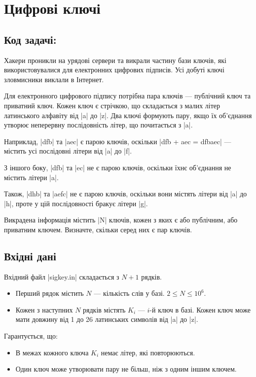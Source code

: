 \documentclass[12pt,a4paper]{article}
\begin{document}
\section*{Цифрові ключі \hfill {}}


\subsection*{Код задачі: }

Хакери проникли на урядові сервери та викрали частину бази ключів, які використовувалися для електронних цифрових підписів.
Усі добуті ключі зловмисники виклали в Інтернет.

Для електронного цифрового підпису потрібна пара ключів --- публічний ключ та приватний ключ. Кожен ключ є стрічкою, що складається з малих літер латинського алфавіту від |a| до |z|. Два ключі формують пару, якщо їх об’єднання утворює неперервну послідовність літер, що почитається з |a|.

Наприклад, |dfb| та |aec| є парою ключів, оскільки |dfb + aec = dfbaec| --- містить усі послідовні літери від |a| до |f|.

З іншого боку, |dfb| та |ec| не є парою ключів, оскільки їхнє об'єднання не містить літери |a|.

Також, |dhb| та |aefc| не є парою ключів, оскільки вони містять літери від |a| до |h|, проте у цій послідовності бракує літери |g|.

Викрадена інформація містить |N| ключів, кожен з яких є або публічним, або приватним ключем. Визначте, скільки серед них є пар ключів.


\subsection*{Вхідні дані}

Вхідний файл |sigkey.in| складається з \(N + 1\) рядків.

\begin{itemize}
    \item Перший рядок містить \(N\) --- кількість слів у базі. \(2 \leq N \leq 10^6 \).
    \item Кожен з наступних \(N\) рядків містять \(K_i\) --- \(i\)-й ключ в базі. Кожен ключ може мати довжину від 1 до 26 латинських символів від |a| до |z|.
\end{itemize}

Гарантується, що:
\begin{itemize}
    \item В межах кожного ключа \(K_i\) немає літер, які повторюються.
    \item Один ключ може утворювати пару не більш, ніж з одним іншим ключем.
\end{itemize}
\end{document}
